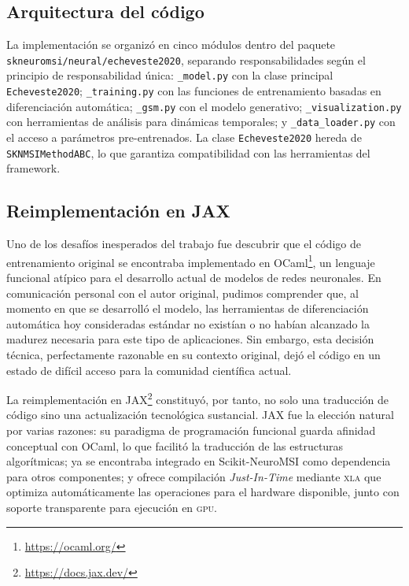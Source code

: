 \documentclass{llncs}
\begin{document}
\subsection{Arquitectura del código}

La implementación se organizó en cinco módulos dentro del paquete
\texttt{skneuromsi/\-neural/\-echeveste2020}, separando
responsabilidades según el principio de responsabilidad única:
\texttt{\_model.py} con la clase principal \texttt{Echeveste2020};
\texttt{\_training.py} con las funciones de entrenamiento basadas en
diferenciación automática; \texttt{\_gsm.py} con el modelo
generativo; \texttt{\_visualization.py} con herramientas de análisis
para dinámicas temporales; y \texttt{\_data\_loader.py} con el acceso
a parámetros pre-entrenados. La clase \texttt{Echeveste2020} hereda
de \texttt{SKNMSIMethodABC}, lo que garantiza compatibilidad con las
herramientas del framework.

\subsection{Reimplementación en JAX}

Uno de los desafíos inesperados del trabajo fue descubrir que el
código de entrenamiento original se encontraba implementado en
OCaml\footnote{\url{https://ocaml.org/}}, un lenguaje funcional
atípico para el desarrollo actual de modelos de redes neuronales. En
comunicación personal con el autor original, pudimos comprender que,
al momento en que se desarrolló el modelo, las herramientas de
diferenciación automática hoy consideradas estándar no existían o no
habían alcanzado la madurez necesaria para este tipo de
aplicaciones. Sin embargo, esta decisión técnica, perfectamente
razonable en su contexto original, dejó el código en un estado de
difícil acceso para la comunidad científica actual.

La reimplementación en JAX\footnote{\url{https://docs.jax.dev/}}
constituyó, por tanto, no solo una traducción de código sino una
actualización tecnológica sustancial. JAX fue la elección natural por
varias razones: su paradigma de programación funcional guarda
afinidad conceptual con OCaml, lo que facilitó la traducción de las
estructuras algorítmicas; ya se encontraba integrado en
Scikit-NeuroMSI como dependencia para otros componentes; y ofrece
compilación \emph{Just-In-Time} mediante \textsc{xla} que optimiza
automáticamente las operaciones para el hardware disponible, junto
con soporte transparente para ejecución en \textsc{gpu}.
\end{document}
